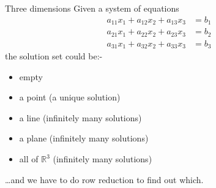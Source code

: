 \documentclass{beamer}
\begin{document}
\begin{frame}{Three dimensions}
  Given a system of equations
  \begin{align*}
    a_{11}x_1+a_{12}x_2+a_{13}x_3 & = b_1\\
    a_{21}x_1+a_{22}x_2+a_{23}x_3 & = b_2\\
    a_{31}x_1+a_{32}x_2+a_{33}x_3 & = b_3
  \end{align*}\vfill
  the solution set could be:-
  \begin{itemize}
  \item empty
  \item a point (a unique solution)
  \item a line (infinitely many solutions)
  \item a plane (infinitely many solutions)
  \item all of $\mathbb R^3$ (infinitely many solutions)
  \end{itemize}
  \dots and we have to do row reduction to find out which.
\end{frame}
\end{document}
